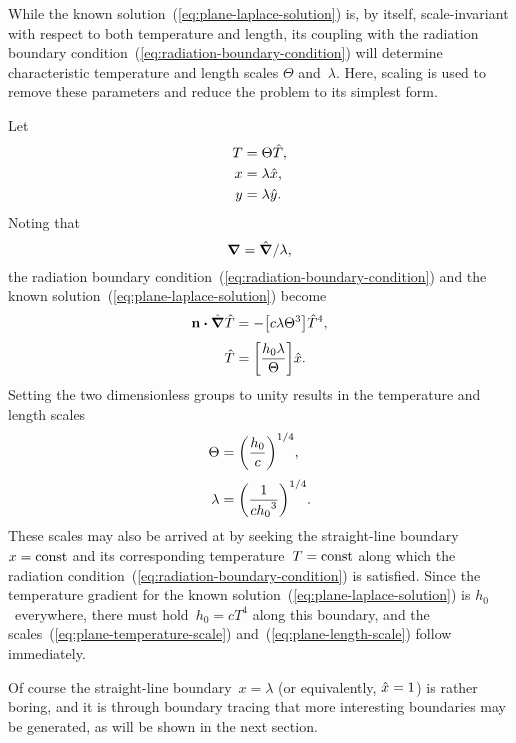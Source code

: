 While the known solution~(\ref{eq:plane-laplace-solution}) is, by itself,
scale-invariant with respect to both temperature and length,
its coupling with
the radiation boundary condition~(\ref{eq:radiation-boundary-condition})
will determine characteristic temperature and length scales
$\Theta$ and~$\lambda$.
Here, scaling is used to remove these parameters
and reduce the problem to its simplest form.

Let
\begin{align}
  T &= \Theta \hat{T}, \label{eq:plane-temperature-scaling} \\
  x &= \lambda \hat{x}, \label{eq:plane-x-scaling} \\
  y &= \lambda \hat{y}. \label{eq:plane-y-scaling}
\end{align}
Noting that
\begin{equation}
  \mathop{}\!\boldsymbol{\mathbf{\nabla}} = \mathop{}\!\hat{\mathop{}\!\boldsymbol{\mathbf{\nabla}}} / \lambda,
  \label{eq:plane-del-scaling}
\end{equation}
the radiation boundary condition~(\ref{eq:radiation-boundary-condition})
and the known solution~(\ref{eq:plane-laplace-solution})
become
\begin{align}
  \normalvec \dotp \scaleddel \scaled{T}
    &= -\group{c \lambda \Theta^3} \scaled{T}^4,
    \label{eq:plane-scaled-radiation-boundary-condition-with-groups}
    \\[\tallspace]
  \scaled{T}
    &= \group{\frac{h_0 \lambda}{\Theta}} \scaled{x}.
    \label{eq:plane-scaled-laplace-solution-with-groups}
\end{align}
Setting the two dimensionless groups to unity
results in the temperature and length scales
\begin{align}
  \Theta &= \roundbr*{\frac{h_0}{c}}^{1/4},
    \label{eq:plane-temperature-scale} \\[\tallspace]
  \lambda &= \roundbr*{\frac{1}{c {h_0}^3}}^{1/4}.
    \label{eq:plane-length-scale}
\end{align}
These scales may also be arrived at
by seeking the straight-line boundary~$x = \mathrm{const}$
and its corresponding temperature~$T = \mathrm{const}$
along which the radiation condition~(\ref{eq:radiation-boundary-condition})
is satisfied.
Since the temperature gradient
for the known solution~(\ref{eq:plane-laplace-solution})
is $h_0$~everywhere,
there must hold~$h_0 = c T^4$ along this boundary,
and the scales~(\ref{eq:plane-temperature-scale})
and~(\ref{eq:plane-length-scale}) follow immediately.

Of course the straight-line boundary~$x = \lambda$
(or equivalently, $\hat{x} = 1$)
is rather boring,
and it is through boundary tracing
that more interesting boundaries may be generated,
as will be shown in the next section.

